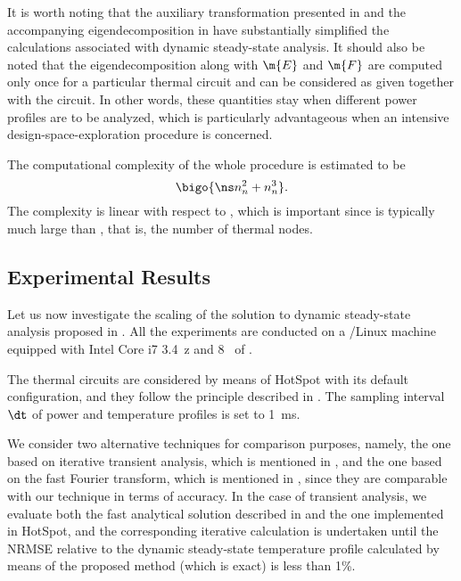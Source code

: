 It is worth noting that the auxiliary transformation presented in
 and the accompanying eigendecomposition in
 have substantially simplified the calculations
associated with dynamic steady-state analysis. It should also be noted that the
eigendecomposition along with $\m{E}$ and $\m{F}$ are computed only once for a
particular thermal  circuit and can be considered as given together with
the circuit. In other words, these quantities stay when different power profiles
are to be analyzed, which is particularly advantageous when an intensive
design-space-exploration procedure is concerned.

The computational complexity of the whole procedure is estimated to be
\[
  \bigo{\ns n_n^2 + n_n^3}.
\]
The complexity is linear with respect to \ns, which is important since \ns is
typically much large than \nn, that is, the number of thermal nodes.

\subsection{Experimental Results}

Let us now investigate the scaling of the solution to dynamic steady-state
analysis proposed in . All the experiments
are conducted on a /Linux machine equipped with Intel Core i7
3.4~z and 8~ of .

The thermal  circuits are considered by means of HotSpot
\cite{skadron2003} with its default configuration, and they follow the principle
described in . The sampling interval $\dt$ of power and
temperature profiles is set to 1~ms.

We consider two alternative techniques for comparison purposes, namely, the one
based on iterative transient analysis, which is mentioned in
, and the one based on the fast Fourier
transform, which is mentioned in , since
they are comparable with our technique in terms of accuracy. In the case of
transient analysis, we evaluate both the fast analytical solution described in
 and the one implemented in HotSpot, and the
corresponding iterative calculation is undertaken until the \ac{NRMSE} relative
to the dynamic steady-state temperature profile calculated by means of the
proposed method (which is exact) is less than 1\%.

